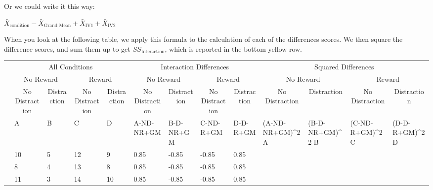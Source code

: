 \documentclass[
]{book}
\begin{document}
Or we could write it this way:

\(\bar{X}_\text{condition} - \bar{X}_\text{Grand Mean} + \bar{X}_\text{IV1} + \bar{X}_\text{IV2}\)

When you look at the following table, we apply this formula to the calculation of each of the differences scores. We then square the difference scores, and sum them up to get \(SS_\text{Interaction}\), which is reported in the bottom yellow row.

\begin{table}
\centering
\begin{tabular}{l|l|l|l|l|l|l|l|l|>{}l|>{}l|>{}l|>{}l}
\hline
\multicolumn{1}{c|}{ } & \multicolumn{4}{c|}{All Conditions} & \multicolumn{4}{c|}{Interaction Differences} & \multicolumn{4}{c}{Squared Differences} \\
\cline{2-5} \cline{6-9} \cline{10-13}
\multicolumn{1}{c|}{ } & \multicolumn{2}{c|}{No Reward} & \multicolumn{2}{c|}{Reward} & \multicolumn{2}{c|}{No Reward} & \multicolumn{2}{c|}{Reward} & \multicolumn{2}{c|}{No Reward} & \multicolumn{2}{c}{Reward} \\
\cline{2-3} \cline{4-5} \cline{6-7} \cline{8-9} \cline{10-11} \cline{12-13}
\multicolumn{1}{c|}{ } & \multicolumn{1}{c|}{No Distraction} & \multicolumn{1}{c|}{Distraction} & \multicolumn{1}{c|}{No Distraction} & \multicolumn{1}{c|}{Distraction} & \multicolumn{1}{c|}{No Distraction} & \multicolumn{1}{c|}{Distraction} & \multicolumn{1}{c|}{No Distraction} & \multicolumn{1}{c|}{Distraction} & \multicolumn{1}{c|}{No Distraction} & \multicolumn{1}{c|}{Distraction} & \multicolumn{1}{c|}{No Distraction} & \multicolumn{1}{c}{Distraction} \\
\cline{2-2} \cline{3-3} \cline{4-4} \cline{5-5} \cline{6-6} \cline{7-7} \cline{8-8} \cline{9-9} \cline{10-10} \cline{11-11} \cline{12-12} \cline{13-13}
  & A & B & C & D & A-ND-NR+GM & B-D-NR+GM & C-ND-R+GM & D-D-R+GM & (A-ND-NR+GM)\textasciicircum{}2 A & (B-D-NR+GM)\textasciicircum{}2 B & (C-ND-R+GM)\textasciicircum{}2 C & (D-D-R+GM)\textasciicircum{}2 D\\
\hline
 & 10 & 5 & 12 & 9 & 0.85 & -0.85 & -0.85 & 0.85 & \cellcolor{yellow}{0.7225} & \cellcolor{yellow}{0.7225} & \cellcolor{yellow}{0.7225} & \cellcolor{yellow}{0.7225}\\
\hline
 & 8 & 4 & 13 & 8 & 0.85 & -0.85 & -0.85 & 0.85 & \cellcolor{yellow}{0.7225} & \cellcolor{yellow}{0.7225} & \cellcolor{yellow}{0.7225} & \cellcolor{yellow}{0.7225}\\
\hline
 & 11 & 3 & 14 & 10 & 0.85 & -0.85 & -0.85 & 0.85 & \cellcolor{yellow}{0.7225} & \cellcolor{yellow}{0.7225} & \cellcolor{yellow}{0.7225} & \cellcolor{yellow}{0.7225}\\

\end{tabular}
\end{table}
\end{document}
